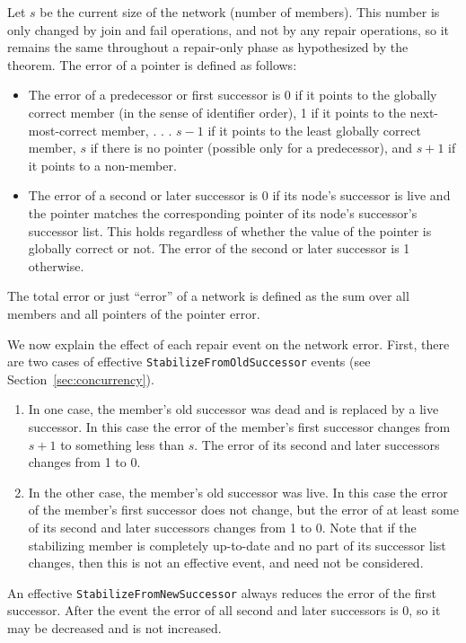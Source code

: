 \documentclass[conference]{IEEEtran}
\begin{document}
Let $s$ be the current size of the network (number of members).
This number is only changed by join and fail operations, and not by
any repair operations, so it remains the same throughout a repair-only
phase as hypothesized by the theorem.
The error of a pointer is defined as follows:
\begin{itemize}
\item
The error of a predecessor or first successor is 0 if it points to the
globally correct member (in the sense of identifier order), 1 if it
points to the next-most-correct member, . . . $s - 1$ if it points to
the least globally correct member, 
$s$ if there is no pointer
(possible only for a predecessor), and
$s + 1$ if it points to a non-member.
\item
The error of a second or later successor is 0 if its node's successor
is live and the pointer
matches the corresponding pointer of its node's successor's
successor list.
This holds regardless of whether the value of the pointer is globally
correct or not.
The error of the second or later successor is 1 otherwise.
\end{itemize}
The total error or just ``error'' of a network
is defined as the sum over all members and
all pointers of the pointer error.

We now explain the effect of each repair event on the network error.
First, there are two cases of effective
\small
{\tt StabilizeFromOldSuccessor}
\normalsize
events (see Section~\ref{sec:concurrency}).
\begin{enumerate}
\item
In one case, the member's old successor was dead and is replaced by
a live successor.
In this case the error of the member's first successor changes from
$s + 1$ to something less than $s$.
The error of its second and later successors changes from 1 to 0.
\item
In the other case, the member's old successor was live.
In this case the error of the member's first successor does not change,
but the error of at least some
of its second and later successors changes from 1 to 0.
Note that if the stabilizing member is completely up-to-date and
no part of its successor list changes, then this is not an effective
event, and need not be considered.
\end{enumerate}

An effective 
\small
{\tt StabilizeFromNewSuccessor}
\normalsize
always
reduces the error of the first successor.  
After the event the error of all second and later successors is 0,
so it may be decreased and is not increased.
\end{document}

